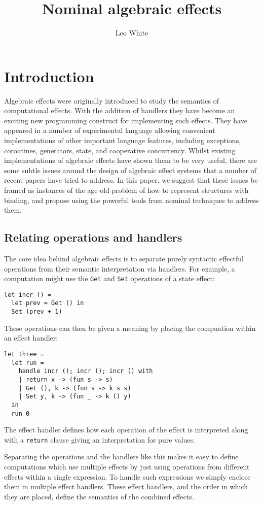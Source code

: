 \documentclass{article}
\title{Nominal algebraic effects}
\author{Leo White}
\date{}
\newcommand{\code}[2][ocaml]{\lstinline[style={#1}]{#2}}
\begin{document}
\maketitle
\section{Introduction}
Algebraic effects were originally introduced\cite{??} to study the
semantics of computational effects. With the addition of
handlers\cite{??} they have become an exciting new programming construct
for implementing such effects. They have appeared in a number of
experimental language\cite{??} allowing convenient implementations of
other important language features, including exceptions, coroutines,
generators, state, and cooperative concurrency.
Whilst existing implementations of algebraic effects have shown them to
be very useful, there are some subtle issues around the design of
algebraic effect systems that a number of recent papers have tried to
address\cite{??}. In this paper, we suggest that these issues be framed
as instances of the age-old problem of how to represent structures with
binding, and propose using the powerful tools from nominal
techniques\cite{??} to address them.

\subsection{Relating operations and handlers}

The core idea behind algebraic effects is to separate purely syntactic
effectful operations from their semantic interpretation via
handlers. For example, a computation might use the \code{Get} and
\code{Set} operations of a state effect:
\begin{lstlisting}
let incr () =
  let prev = Get () in
  Set (prev + 1)
\end{lstlisting}
These operations can then be given a meaning by placing the compuation
within an effect handler:
\begin{lstlisting}
let three =
  let run =
    handle incr (); incr (); incr () with
    | return x -> (fun s -> s)
    | Get (), k -> (fun s -> k s s)
    | Set y, k -> (fun _ -> k () y)
  in
  run 0
\end{lstlisting}
The effect handler defines how each operation of the effect is
interpreted along with a \code{return} clause giving an interpretation
for pure values.

Separating the operations and the handlers like this makes it easy to
define computations which use multiple effects by just using operations
from different effects within a single expression. To handle such
expressions we simply enclose them in multiple effect handlers. These
effect handlers, and the order in which they are placed, define
the semantics of the combined effects.
\end{document}

